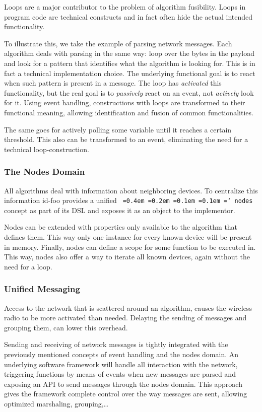 \documentclass[conference]{IEEEtran}
\newcommand{\NAME}{id-foo\xspace}
\newcommand*\justify{%
  \fontdimen2\font=0.4em%
  \fontdimen3\font=0.2em%
  \fontdimen4\font=0.1em%
  \fontdimen7\font=0.1em%
  \hyphenchar\font=`\-%
}
\newcommand{\ttt}[1]{\texttt{\justify{#1}}}
\begin{document}
Loops are a major contributor to the problem of algorithm fusibility. Loops in
program code are technical constructs and in fact often hide the actual
intended functionality.

To illustrate this, we take the example of parsing network messages. Each
algorithm deals with parsing in the same way: loop over the bytes in the
payload and look for a pattern that identifies what the algorithm is looking
for. This is in fact a technical implementation choice. The underlying
functional goal is to react when such pattern is present in a message. The loop
has \emph{activated} this functionality, but the real goal is to
\emph{passively} react on an event, not \emph{actively} look for it. Using
event handling, constructions with loops are transformed to their functional
meaning, allowing identification and fusion of common functionalities.

The same goes for actively polling some variable until it reaches a certain
threshold. This also can be transformed to an event, eliminating the need for a
technical loop-construction.

\subsubsection*{The Nodes Domain}

All algorithms deal with information about neighboring devices. To centralize
this information \NAME provides a unified \ttt{nodes} concept as part of its
DSL and exposes it as an object to the implementor.

Nodes can be extended with properties only available to the algorithm that
defines them. This way only one instance for every known device will be present
in memory. Finally, nodes can define a scope for some function to be executed
in. This way, nodes also offer a way to iterate all known devices, again
without the need for a loop.

\subsubsection*{Unified Messaging}
\label{dsl-unified-msg}

Access to the network that is scattered around an algorithm, causes the
wireless radio to be more activated than needed. Delaying the sending of
messages and grouping them, can lower this overhead.

Sending and receiving of network messages is tightly integrated with the
previously mentioned concepts of event handling and the nodes domain. An
underlying software framework will handle all interaction with the network,
triggering functions by means of events when new messages are parsed and
exposing an API to send messages through the nodes domain. This approach gives
the framework complete control over the way messages are sent, allowing
optimized marshaling, grouping,\dots
\end{document}
